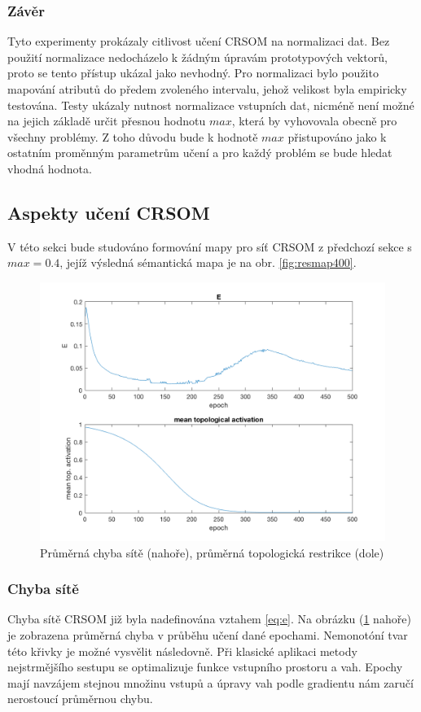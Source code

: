 \documentclass[thesis=M,czech]{FITthesis}[2012/06/26]
\begin{document}
\subsubsection*{Závěr}
Tyto experimenty prokázaly citlivost učení CRSOM na normalizaci dat. Bez použití normalizace nedocházelo k žádným úpravám prototypových vektorů, proto se tento přístup ukázal jako nevhodný. Pro normalizaci bylo použito mapování atributů do předem zvoleného intervalu, jehož velikost byla empiricky testována. Testy ukázaly nutnost normalizace vstupních dat, nicméně není možné na jejich základě určit přesnou hodnotu $max$, která by vyhovovala obecně pro všechny problémy. Z toho důvodu bude k hodnotě $max$ přistupováno jako k ostatním proměnným parametrům učení a pro každý problém se bude hledat vhodná hodnota.


\subsection{Aspekty učení CRSOM}
V této sekci bude studováno formování mapy pro síť CRSOM z předchozí sekce s $max=0.4$, jejíž výsledná sémantická mapa je na obr. \ref{fig:resmap400}. 

\begin{figure}[htp]    
    \centering
   \includegraphics[scale=0.25]{mse_top.png}
     \caption{Průměrná chyba sítě (nahoře), průměrná topologická restrikce (dole)} 
    \label{fig:msetopp}
\end{figure}

\subsubsection*{Chyba sítě}
Chyba sítě CRSOM již byla nadefinována vztahem \ref{eq:e}. Na obrázku (\ref{fig:msetopp} nahoře) je zobrazena průměrná chyba v průběhu učení dané epochami. Nemonotóní tvar této křivky je možné vysvělit následovně. Při klasické aplikaci metody nejstrmějšího sestupu se optimalizuje funkce vstupního prostoru a vah. Epochy mají navzájem stejnou množinu vstupů a úpravy vah podle gradientu nám zaručí nerostoucí průměrnou chybu.
\end{document}
